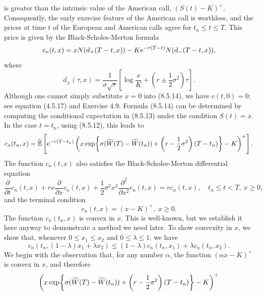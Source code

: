 is greater than the intrinsic value of the American call, $(S(t) - K)^+$. Consequently, the early exercise feature of the American call is worthless, and the prices at time $t$ of the European and American calls agree for $t_n \le t \le T$. This price is given by the Black-Scholes-Merton formula
\begin{equation}
	c_n(t, x) = x N(d_+(T - t, x)) - K \e^{-r(T-t)} N(d_-(T - t, x)), \label{eq:BSMFormula}
\end{equation}
where
\[
	d_{\pm}(\tau, x) = \frac{1}{\sigma\sqrt{\tau}} \left[ \log \frac{x}{K} + \left( r \pm \frac{1}{2}\sigma^2 \right) \tau \right].
\]
Although one cannot simply substitute $x = 0$ into (8.5.14), we have $c(t, 0) = 0$; see equation (4.5.17) and Exercise 4.9. Formula (8.5.14) can be determined by computing the conditional expectation in (8.5.13) under the condition $S(t) = x$. In the case $t = t_n$, using (8.5.12), this leads to
\begin{equation}
	c_n(t_n, x) = \widetilde{\E} \left[ \e^{-r(T-t_n)} \left( x \exp \set[\bigg]{ \sigma (\widetilde{W}(T) - \widetilde{W}(t_n)) + \left( r - \frac{1}{2}\sigma^2 \right) (T - t_n) } - K \right)^+ \right]. \label{eq:ConditionalExpectationTn}
\end{equation}
The function $c_n(t, x)$ also satisfies the Black-Scholes-Merton differential equation
\begin{equation}
	\frac{\partial}{\partial t} c_n(t, x) + rx \frac{\partial}{\partial x} c_n(t, x) + \frac{1}{2}\sigma^2 x^2 \frac{\partial^2}{\partial x^2} c_n(t, x) = r c_n(t, x), \quad t_n \le t < T, \ x \ge 0, \label{eq:BSMPDE}
\end{equation}
and the terminal condition
\begin{equation}
	c_n(t, x) = (x - K)^+, \ x \ge 0. \label{eq:TerminalCondition}
\end{equation}
The function $c_n(t_n, x)$ is convex in $x$. This is well-known, but we establish it here anyway to demonstrate a method we need later. To show convexity in $x$, we show that, whenever $0 \le x_1 \le x_2$ and $0 \le \lambda \le 1$, we have
\begin{equation}
	c_n(t_n, (1 - \lambda)x_1 + \lambda x_2) \le (1 - \lambda)c_n(t_n, x_1) + \lambda c_n(t_n, x_2). \label{eq:ConvexityInequality}
\end{equation}
We begin with the observation that, for any number $\alpha$, the function $(\alpha x - K)^+$ is convex in $x$, and therefore
\[
	\left( x \exp \set[\bigg]{ \sigma (\widetilde{W}(T) - \widetilde{W}(t_n)) + \left( r - \frac{1}{2}\sigma^2 \right) (T - t_n) } - K \right)^+
\]
